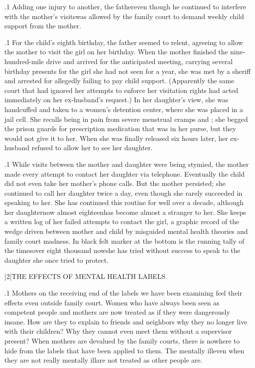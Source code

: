 \documentclass[11pt, twoside]{article}
\begin{document}
{\p.1{%
Adding one injury to another, the father\mdash{}even though he continued
to interfere with the mother’s visits\mdash{}was allowed by the family court to
demand weekly child support from the mother.
}%

\p.1{%
For the child’s eighth birthday, the father seemed to relent, agreeing to allow the mother to visit the girl on her birthday. When the
mother finished the nine-hundred-mile drive and arrived for the anticipated meeting, carrying several birthday presents for the girl she had
not seen for a year, she was met by a sheriff and arrested for allegedly
failing to pay child support. (Apparently the same court that had ignored
her attempts to enforce her visitation rights had acted immediately on
her ex-husband’s request.) In her daughter’s view, she was handcuffed
and taken to a women’s detention center, where she was placed in a
 jail cell. She recalls being  in pain from severe menstrual cramps and ; she begged the
prison guards for prescription medication that was in her purse, but they
would not give it to her. When she was finally released six hours later,
her ex-husband refused to allow her to see her daughter.
}%

\p.1{%
While visits between the mother and daughter were being stymied,
the mother made every attempt to contact her daughter via telephone.
Eventually the child did not even take her mother’s phone calls. But
the mother persisted; she continued to call her daughter twice a day,
even though she rarely succeeded in speaking to her. She has continued this routine for well over a decade, although her daughter\mdash{}now
almost eighteen\mdash{}has become almost a stranger to her. She keeps a
written log of her failed attempts to contact the girl, a graphic record
of the wedge driven between mother and child by misguided mental
health theories and family court madness. In black felt marker at the
bottom is the running tally of the times\mdash{}over eight
thousand now\mdash{}she has tried without success
to speak to the daughter she once tried to protect.
}%


\s|2|{THE EFFECTS OF MENTAL HEALTH LABELS}

\p.1{%
\noindent{}Mothers on the receiving end of the labels we have been examining feel
their effects even outside family court. Women who have always been
seen as competent people and mothers are now treated as if they were
dangerously insane. How are they to explain to friends and neighbors
why they no longer live with their children? Why they cannot even meet
them without a supervisor present? When mothers are devalued by the
family courts, there is nowhere to hide from the labels that have been applied to them. The mentally ill\mdash{}even when they are not really mentally
ill\mdash{}are not treated as other people are.
}%

}
\end{document}
